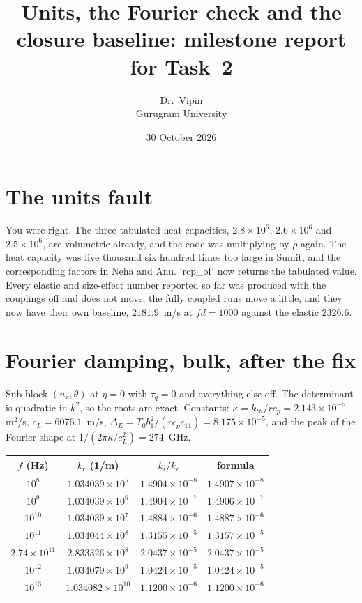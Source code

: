 \documentclass[11pt,a4paper]{article}
\title{\vspace{-1.4cm}\Large Units, the Fourier check and the closure baseline: milestone report for Task~2}
\author{Dr.\ Vipin\\ Gurugram University}
\date{30 October 2026}
\begin{document}
\maketitle
\vspace{-7mm}

\section*{The units fault}

You were right. The three tabulated heat capacities, $2.8\times10^{6}$, $2.6\times10^{6}$ and
$2.5\times10^{6}$, are volumetric already, and the code was multiplying by $\rho$ again. The heat
capacity was five thousand six hundred times too large in Sumit, and the corresponding factors in
Neha and Anu. `rcp_of` now returns the tabulated value. Every elastic and size-effect number
reported so far was produced with the couplings off and does not move; the fully coupled runs move
a little, and they now have their own baseline, $2181.9$~m/s at $fd=1000$ against the elastic
$2326.6$.

\section*{Fourier damping, bulk, after the fix}

Sub-block $(u_x,\theta)$ at $\eta=0$ with $\tau_q=0$ and everything else off. The determinant is
quadratic in $k^{2}$, so the roots are exact. Constants: $\kappa=k_{th}/r c_p=2.143\times10^{-5}$
m$^{2}$/s, $c_L=6076.1$~m/s, $\Delta_E=T_0b_1^{2}/(r c_p c_{11})=8.175\times10^{-5}$, and the peak
of the Fourier shape at $1/(2\pi\kappa/c_L^{2})=274$~GHz.

\begin{center}\footnotesize
\begin{tabular}{cccc}
\toprule
$f$ (Hz) & $k_r$ (1/m) & $k_i/k_r$ & formula\\
\midrule
$10^{8}$ & $1.034039\times10^{5}$ & $1.4904\times10^{-8}$ & $1.4907\times10^{-8}$\\
$10^{9}$ & $1.034039\times10^{6}$ & $1.4904\times10^{-7}$ & $1.4906\times10^{-7}$\\
$10^{10}$ & $1.034039\times10^{7}$ & $1.4884\times10^{-6}$ & $1.4887\times10^{-6}$\\
$10^{11}$ & $1.034044\times10^{8}$ & $1.3155\times10^{-5}$ & $1.3157\times10^{-5}$\\
$2.74\times10^{11}$ & $2.833326\times10^{8}$ & $2.0437\times10^{-5}$ & $2.0437\times10^{-5}$\\
$10^{12}$ & $1.034079\times10^{9}$ & $1.0424\times10^{-5}$ & $1.0424\times10^{-5}$\\
$10^{13}$ & $1.034082\times10^{10}$ & $1.1200\times10^{-6}$ & $1.1200\times10^{-6}$\\
\bottomrule
\end{tabular}
\end{center}
\end{document}
